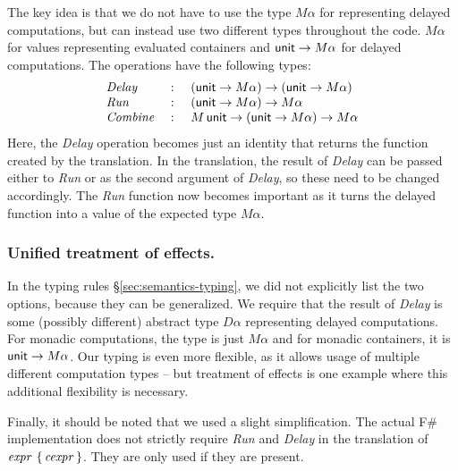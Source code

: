 \documentclass[runningheads,a4paper]{llncs}
\begin{document}
\noindent
The key idea is that we do not have to use the type $M\alpha$ for representing delayed computations,
but can instead use two different types throughout the code. $M\alpha$ for values representing
evaluated containers and $\textnormal{\sffamily unit} \rightarrow M\alpha$ for delayed computations. The operations 
have the following types:
%
\begin{equation*}
\begin{array}{lcl}
\emph{Delay}   &~:~& (\textnormal{\sffamily unit} \rightarrow M\alpha) \rightarrow (\textnormal{\sffamily unit} \rightarrow M\alpha)\\
\emph{Run}     &~:~& (\textnormal{\sffamily unit} \rightarrow M\alpha) \rightarrow M\alpha\\
\emph{Combine} &~:~& M\,\textnormal{\sffamily unit} \rightarrow (\textnormal{\sffamily unit} \rightarrow M\alpha) \rightarrow M\alpha
\end{array}
\end{equation*}
%
Here, the \emph{Delay} operation becomes just an identity that returns the function created by the
translation. In the translation, the result of \emph{Delay} can be passed either to \emph{Run}
or as the second argument of \emph{Delay}, so these need to be changed accordingly. The \emph{Run}
function now becomes important as it turns the delayed function into a value of the expected
type $M\alpha$.

\vspace{-1em}
\subsubsection{Unified treatment of effects.} In the typing rules \S\ref{sec:semantics-typing}, 
we did not explicitly list the two options, because they can be generalized. We require that the
result of \emph{Delay} is some (possibly different) abstract type $D\alpha$ representing delayed
computations. For monadic computations, the type is just $M\alpha$ and for monadic containers,
it is $\textnormal{\sffamily unit} \rightarrow M\alpha$. Our typing is even more flexible, as it allows usage of 
multiple different computation types -- but treatment of effects is one example where this
additional flexibility is necessary.

Finally, it should be noted that we used a slight simplification. The actual F\# implementation 
does not strictly require \emph{Run} and \emph{Delay} in the translation of $\textnormal{\emph{expr}}~\{\,\textnormal{\emph{cexpr}}\,\}$. 
They are only used if they are present. 


\end{document}

